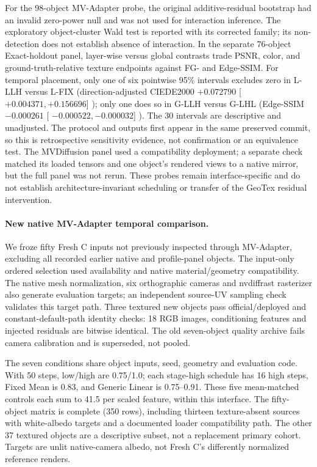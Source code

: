 \documentclass[times,twocolumn,final]{elsarticle}
\providecommand{\DIFadd}[1]{{\protect\color{blue} \sf #1}} %
\providecommand{\DIFaddbegin}{} %
\providecommand{\DIFaddend}{} %
\begin{document}
  \DIFaddbegin \DIFadd{For the 98-object MV-Adapter probe, the original additive-residual bootstrap had an invalid zero-power null and was not used for interaction inference. The exploratory object-cluster Wald test is reported with its corrected family; its non-detection does not establish absence of interaction. In the separate 76-object Exact-holdout panel, layer-wise versus global contrasts trade PSNR, color, and ground-truth-relative texture endpoints against FG- and Edge-SSIM. For temporal placement, only one of six pointwise 95\% intervals excludes zero in L-LLH versus L-FIX (direction-adjusted CIEDE2000 $+0.072790$ }[\DIFadd{$+0.004371,+0.156696$}]\DIFadd{); only one does so in G-LLH versus G-LHL (Edge-SSIM $-0.000261$ }[\DIFadd{$-0.000522,-0.000032$}]\DIFadd{). The 30 intervals are descriptive and unadjusted. The protocol and outputs first appear in the same preserved commit, so this is retrospective sensitivity evidence, not confirmation or an equivalence test. The MVDiffusion panel used a compatibility deployment; a separate check matched its loaded tensors and one object's rendered views to a native mirror, but the full panel was not rerun. These probes remain interface-specific and do not establish architecture-invariant scheduling or transfer of the GeoTex residual intervention.
}


\paragraph{New native MV-Adapter temporal comparison.}
\label{subsec:new-mva}
\DIFadd{We froze fifty Fresh C inputs not previously inspected through MV-Adapter, excluding all recorded earlier native and profile-panel objects. The input-only ordered selection used availability and native material/geometry compatibility. The native mesh normalization, six orthographic cameras and nvdiffrast rasterizer also generate evaluation targets; an independent source-UV sampling check validates this target path. Three textured new objects pass official/deployed and constant-default-path identity checks: 18 RGB images, conditioning features and injected residuals are bitwise identical. The old seven-object quality archive fails camera calibration and is superseded, not pooled.
}

\DIFadd{The seven conditions share object inputs, seed, geometry and evaluation code. With 50 steps, low/high are 0.75/1.0; each stage-high schedule has 16 high steps, Fixed Mean is 0.83, and Generic Linear is 0.75--0.91. These five mean-matched controls each sum to 41.5 per scaled feature, within this interface. The fifty-object matrix is complete (350 rows), including thirteen texture-absent sources with white-albedo targets and a documented loader compatibility path. The other 37 textured objects are a descriptive subset, not a replacement primary cohort. Targets are unlit native-camera albedo, not Fresh C's differently normalized reference renders}\DIFaddend .
\end{document}
